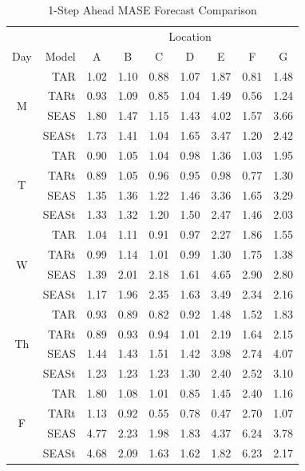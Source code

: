 \begin{table}[htbp]
\scriptsize
\centering
\caption{1-Step Ahead MASE Forecast Comparison}
\begin{tabular}{c|rccccccc}
  \hline
  & & \multicolumn{7}{c}{Location}\\
  \cline{5-7}
Day & Model & A & B & C & D & E & F & G \\ 
  \hline
  \multirow{4}{*}{M} & TAR & 1.02 & 1.10 & 0.88 & 1.07 & 1.87 & 0.81 & 1.48 \\ 
  & TARt & 0.93 & 1.09 & 0.85 & 1.04 & 1.49 & 0.56 & 1.24 \\ 
  & SEAS & 1.80 & 1.47 & 1.15 & 1.43 & 4.02 & 1.57 & 3.66 \\ 
  & SEASt & 1.73 & 1.41 & 1.04 & 1.65 & 3.47 & 1.20 & 2.42 \\ 
  \hline
  \multirow{4}{*}{T}  & TAR & 0.90 & 1.05 & 1.04 & 0.98 & 1.36 & 1.03 & 1.95 \\ 
   & TARt & 0.89 & 1.05 & 0.96 & 0.95 & 0.98 & 0.77 & 1.30 \\ 
  & SEAS & 1.35 & 1.36 & 1.22 & 1.46 & 3.36 & 1.65 & 3.29 \\ 
   & SEASt & 1.33 & 1.32 & 1.20 & 1.50 & 2.47 & 1.46 & 2.03 \\ 
  \hline
   \multirow{4}{*}{W} & TAR & 1.04 & 1.11 & 0.91 & 0.97 & 2.27 & 1.86 & 1.55 \\ 
   & TARt & 0.99 & 1.14 & 1.01 & 0.99 & 1.30 & 1.75 & 1.38 \\ 
   & SEAS & 1.39 & 2.01 & 2.18 & 1.61 & 4.65 & 2.90 & 2.80 \\ 
   & SEASt & 1.17 & 1.96 & 2.35 & 1.63 & 3.49 & 2.34 & 2.16 \\ 
  \hline
 \multirow{4}{*}{Th} & TAR & 0.93 & 0.89 & 0.82 & 0.92 & 1.48 & 1.52 & 1.83 \\ 
   & TARt & 0.89 & 0.93 & 0.94 & 1.01 & 2.19 & 1.64 & 2.15 \\ 
   & SEAS & 1.44 & 1.43 & 1.51 & 1.42 & 3.98 & 2.74 & 4.07 \\ 
   & SEASt & 1.23 & 1.23 & 1.23 & 1.30 & 2.40 & 2.52 & 3.10 \\ 
  \hline
  \multirow{4}{*}{F} & TAR & 1.80 & 1.08 & 1.01 & 0.85 & 1.45 & 2.40 & 1.16 \\ 
   & TARt & 1.13 & 0.92 & 0.55 & 0.78 & 0.47 & 2.70 & 1.07 \\ 
   & SEAS & 4.77 & 2.23 & 1.98 & 1.83 & 4.37 & 6.24 & 3.78 \\ 
   & SEASt & 4.68 & 2.09 & 1.63 & 1.62 & 1.82 & 6.23 & 2.17 \\ 
   \hline
\end{tabular}
\label{ref:trafficmase1}
\end{table}

